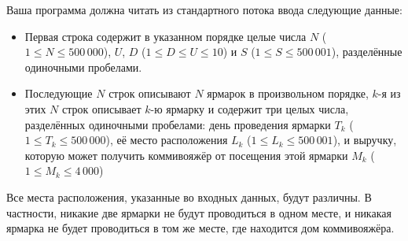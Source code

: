 Ваша программа должна читать из стандартного потока ввода следующие данные:
\begin{itemize}
\item Первая строка содержит в указанном порядке целые числа $N$ ($1 \le N \le 500\,000$), $U$, $D$ ($1 \le D \le U \le 10$) и $S$ ($1 \le S \le 500\,001$), разделённые одиночными
пробелами.
\item Последующие $N$ строк описывают $N$ ярмарок в произвольном порядке, $k$-я из этих $N$ строк описывает $k$-ю ярмарку и содержит три целых числа, разделённых одиночными пробелами: день проведения ярмарки  $T_k$ ($1 \le T_k \le 500\,000$), её место расположения $L_k$ ($1 \le L_k \le 500\,001$), и выручку, которую может получить коммивояжёр от посещения этой ярмарки $M_k$ ($1 \le M_k \le 4\,000$)
\end{itemize}

Все места расположения, указанные во входных данных, будут различны. В частности,
никакие две ярмарки не будут проводиться в одном месте, и никакая ярмарка не будет проводиться в том же месте, где находится дом коммивояжёра.